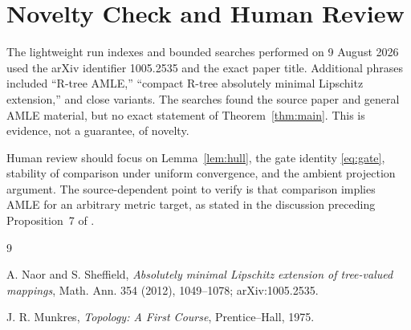 \documentclass[11pt]{article}
\begin{document}
\section*{Novelty Check and Human Review}

The lightweight run indexes and bounded searches performed on 9 August 2026
used the arXiv identifier 1005.2535 and the exact paper title.  Additional
phrases included ``R-tree AMLE,'' ``compact R-tree absolutely minimal
Lipschitz extension,'' and close variants.  The searches found the
source paper and general AMLE material, but no exact statement of
Theorem~\ref{thm:main}.  This is evidence, not a guarantee, of novelty.

Human review should focus on Lemma~\ref{lem:hull}, the gate identity
\eqref{eq:gate}, stability of comparison under uniform convergence, and the
ambient projection argument.  The source-dependent point to verify is that
comparison implies AMLE for an arbitrary metric target, as stated in the
discussion preceding Proposition~7 of \cite{NS}.

\begin{thebibliography}{9}

A. Naor and S. Sheffield,
\emph{Absolutely minimal Lipschitz extension of tree-valued mappings},
Math. Ann. 354 (2012), 1049--1078; arXiv:1005.2535.

J. R. Munkres,
\emph{Topology: A First Course},
Prentice--Hall, 1975.

\end{thebibliography}
\end{document}
